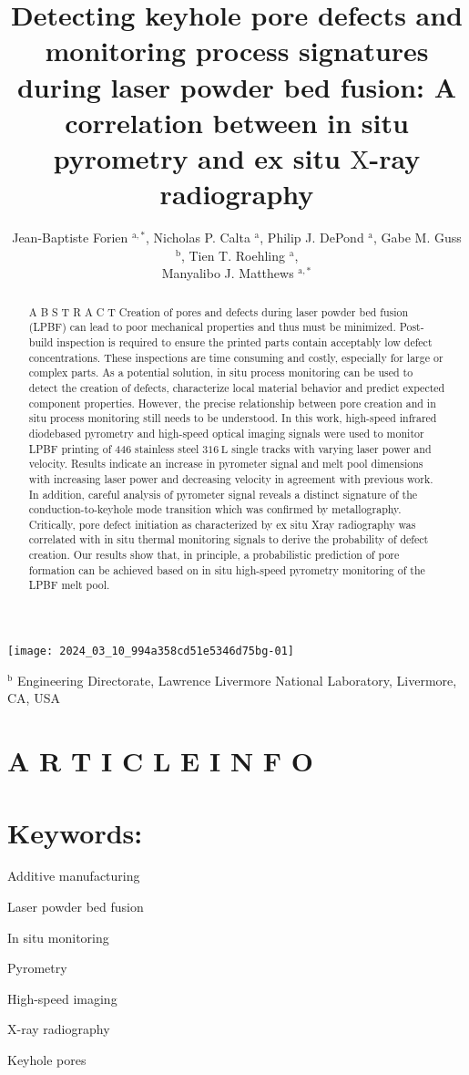 \documentclass[10pt]{article}
\title{Detecting keyhole pore defects and monitoring process signatures during laser powder bed fusion: A correlation between in situ pyrometry and ex situ $\mathrm{X}$-ray radiography }
\author{Jean-Baptiste Forien ${ }^{\mathrm{a}, *}$, Nicholas P. Calta ${ }^{\mathrm{a}}$, Philip J. DePond ${ }^{\mathrm{a}}$, Gabe M. Guss ${ }^{\mathrm{b}}$, Tien T. Roehling ${ }^{\mathrm{a}}$,\\
Manyalibo J. Matthews ${ }^{\mathrm{a}, *}$}
\date{}
\begin{document}
\maketitle
\begin{center}
\texttt{[image: 2024\_03\_10\_994a358cd51e5346d75bg-01]}
\end{center}

${ }^{\mathrm{b}}$ Engineering Directorate, Lawrence Livermore National Laboratory, Livermore, CA, USA

\section*{A R T I C L E I N F O}
\section*{Keywords:}
Additive manufacturing

Laser powder bed fusion

In situ monitoring

Pyrometry

High-speed imaging

X-ray radiography

Keyhole pores

\begin{abstract}
A B S T R A C T Creation of pores and defects during laser powder bed fusion (LPBF) can lead to poor mechanical properties and thus must be minimized. Post-build inspection is required to ensure the printed parts contain acceptably low defect concentrations. These inspections are time consuming and costly, especially for large or complex parts. As a potential solution, in situ process monitoring can be used to detect the creation of defects, characterize local material behavior and predict expected component properties. However, the precise relationship between pore creation and in situ process monitoring still needs to be understood. In this work, high-speed infrared diodebased pyrometry and high-speed optical imaging signals were used to monitor LPBF printing of 446 stainless steel $316 \mathrm{~L}$ single tracks with varying laser power and velocity. Results indicate an increase in pyrometer signal and melt pool dimensions with increasing laser power and decreasing velocity in agreement with previous work. In addition, careful analysis of pyrometer signal reveals a distinct signature of the conduction-to-keyhole mode transition which was confirmed by metallography. Critically, pore defect initiation as characterized by ex situ Xray radiography was correlated with in situ thermal monitoring signals to derive the probability of defect creation. Our results show that, in principle, a probabilistic prediction of pore formation can be achieved based on in situ high-speed pyrometry monitoring of the LPBF melt pool.
\end{abstract}
\end{document}
